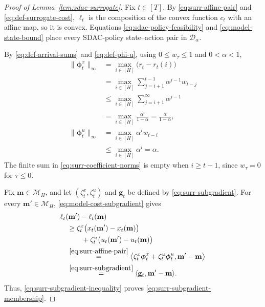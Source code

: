 \documentclass[journal]{IEEEtran}
\theoremstyle{remark}
\begin{document}
\begin{proof}[Proof of Lemma~\ref{lem:sdac-surrogate}]
Fix $t\in[T]$. By \eqref{eq:surr-affine-pair} and
\eqref{eq:def-surrogate-cost}, $\ell_t$ is the composition of the convex
function $c_t$ with an affine map, so it is convex.
Equations \eqref{eq:sdac-policy-feasibility} and \eqref{eq:model-state-bound} place
every SDAC-policy state--action pair in $\mathcal{D}_\alpha$.

By \eqref{eq:def-arrival-sums} and \eqref{eq:def-phi-u}, using
$0\le w_\tau\le1$ and $0<\alpha<1$,
\begin{equation}
\label{eq:surr-coefficient-norms}
\begin{aligned}
\|\boldsymbol{\phi}_t^x\|_\infty
&=\max_{i\in[H]}\bigl(r_t-r_t(i)\bigr)\\
&=\max_{i\in[H]}\sum_{j=i+1}^{t-1}\alpha^{j-1}w_{t-j}\\
&\le\max_{i\in[H]}\sum_{j=i+1}^{\infty}\alpha^{j-1}\\
&=\max_{i\in[H]}\frac{\alpha^i}{1-\alpha}
=\frac{\alpha}{1-\alpha},\\
\|\boldsymbol{\phi}_t^u\|_\infty
&=\max_{i\in[H]}\alpha^i w_{t-i}\\
&\le\max_{i\in[H]}\alpha^i=\alpha.
\end{aligned}
\end{equation}
The finite sum in \eqref{eq:surr-coefficient-norms} is empty when
$i\ge t-1$, since $w_\tau=0$ for $\tau\le0$.

Fix $\mathbf{m}\in\mathcal{M}_H$, and let $(\zeta_t^x,\zeta_t^u)$ and
$\mathbf{g}_t$ be defined by \eqref{eq:surr-subgradient}. For every
$\mathbf{m}'\in\mathcal{M}_H$, \eqref{eq:model-cost-subgradient} gives
\begin{equation}
\label{eq:surr-subgradient-inequality}
\begin{aligned}
&\ell_t(\mathbf{m}')-\ell_t(\mathbf{m})\\
&\quad\ge\zeta_t^x\bigl(x_t(\mathbf{m}')-x_t(\mathbf{m})\bigr)\\
&\qquad\quad+\zeta_t^u\bigl(u_t(\mathbf{m}')-u_t(\mathbf{m})\bigr)\\
&\quad\overset{\eqref{eq:surr-affine-pair}}{=}\bigl\langle
\zeta_t^x\boldsymbol{\phi}_t^x+\zeta_t^u\boldsymbol{\phi}_t^u,
\mathbf{m}'-\mathbf{m}\bigr\rangle\\
&\quad\overset{\eqref{eq:surr-subgradient}}{=}
\langle\mathbf{g}_t,\mathbf{m}'-\mathbf{m}\rangle.
\end{aligned}
\end{equation}
Thus, \eqref{eq:surr-subgradient-inequality}
proves \eqref{eq:surr-subgradient-membership}.


\end{proof}
\end{document}
